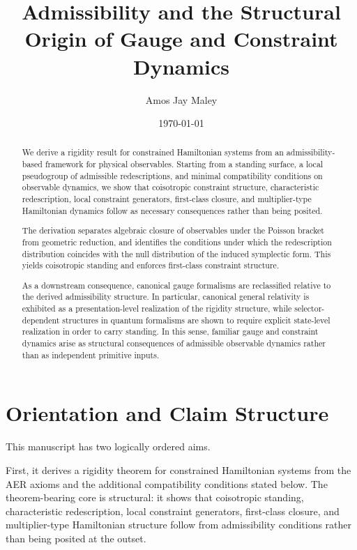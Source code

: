 \documentclass[11pt]{article}
\title{Admissibility and the Structural Origin of Gauge and Constraint Dynamics}
\author{Amos Jay Maley}
\date{\today}
\theoremstyle{remark}
\theoremstyle{plain}
\begin{document}
\maketitle

\begin{abstract}
We derive a rigidity result for constrained Hamiltonian systems from an admissibility-based framework for physical observables. Starting from a standing surface, a local pseudogroup of admissible redescriptions, and minimal compatibility conditions on observable dynamics, we show that coisotropic constraint structure, characteristic redescription, local constraint generators, first-class closure, and multiplier-type Hamiltonian dynamics follow as necessary consequences rather than being posited.

The derivation separates algebraic closure of observables under the Poisson bracket from geometric reduction, and identifies the conditions under which the redescription distribution coincides with the null distribution of the induced symplectic form. This yields coisotropic standing and enforces first-class constraint structure.

As a downstream consequence, canonical gauge formalisms are reclassified relative to the derived admissibility structure. In particular, canonical general relativity is exhibited as a presentation-level realization of the rigidity structure, while selector-dependent structures in quantum formalisms are shown to require explicit state-level realization in order to carry standing. In this sense, familiar gauge and constraint dynamics arise as structural consequences of admissible observable dynamics rather than as independent primitive inputs.
\end{abstract}



\section*{Orientation and Claim Structure}

This manuscript has two logically ordered aims.

First, it derives a rigidity theorem for constrained Hamiltonian systems from the AER axioms and the additional compatibility conditions stated below. The theorem-bearing core is structural: it shows that coisotropic standing, characteristic redescription, local constraint generators, first-class closure, and multiplier-type Hamiltonian structure follow from admissibility conditions rather than being posited at the outset.
\end{document}
